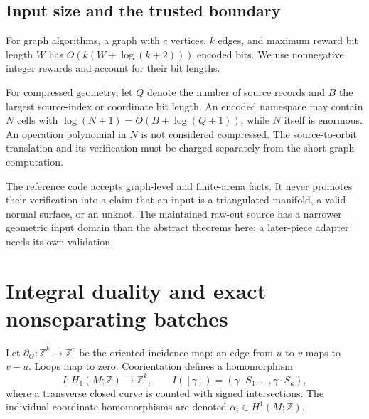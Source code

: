 \documentclass[11pt]{article}
\theoremstyle{definition}
\newcommand{\Z}{\mathbb Z}
\begin{document}
\subsection{Input size and the trusted boundary}
For graph algorithms, a graph with $c$ vertices, $k$ edges, and maximum reward bit length $W$ has $O(k(W+\log(k+2)))$ encoded bits. We use nonnegative integer rewards and account for their bit lengths.

For compressed geometry, let $Q$ denote the number of source records and $B$ the largest source-index or coordinate bit length. An encoded namespace may contain $N$ cells with $\log(N+1)=O(B+\log(Q+1))$, while $N$ itself is enormous. An operation polynomial in $N$ is not considered compressed. The source-to-orbit translation and its verification must be charged separately from the short graph computation.

The reference code accepts graph-level and finite-arena facts. It never promotes their verification into a claim that an input is a triangulated manifold, a valid normal surface, or an unknot. The maintained raw-cut source has a narrower geometric input domain than the abstract theorems here; a later-piece adapter needs its own validation.

\section{Integral duality and exact nonseparating batches}\label{sec:duality}
Let $\partial_G:\Z^k\to\Z^c$ be the oriented incidence map: an edge from $u$ to $v$ maps to $v-u$. Loops map to zero. Coorientation defines a homomorphism
\[
 I:H_1(M;\Z)\longrightarrow\Z^k,
 \qquad I([\gamma])=(\gamma\cdot S_1,\ldots,\gamma\cdot S_k),
\]
where a transverse closed curve is counted with signed intersections. The individual coordinate homomorphisms are denoted $\alpha_i\in H^1(M;\Z)$.
\end{document}
